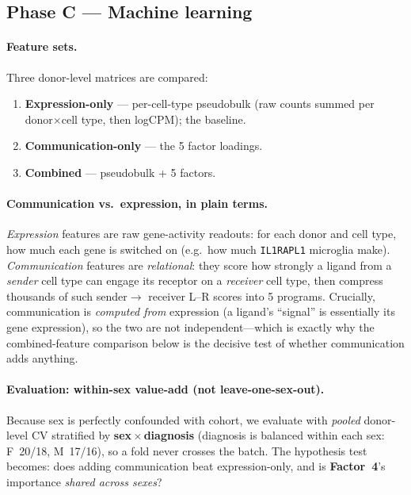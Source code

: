 \documentclass[11pt]{article}
\newcommand{\factorfour}{\textbf{Factor~4}}
\newcommand{\code}[1]{\texttt{\small #1}}
\begin{document}
\subsection{Phase C --- Machine learning}
\label{sec:phaseC}

\paragraph{Feature sets.} Three donor-level matrices are compared:
\begin{enumerate}
\item \textbf{Expression-only} --- per-cell-type pseudobulk (raw counts summed
per donor$\times$cell type, then logCPM); the baseline.
\item \textbf{Communication-only} --- the 5 factor loadings.
\item \textbf{Combined} --- pseudobulk + 5 factors.
\end{enumerate}

\paragraph{Communication vs.\ expression, in plain terms.}
\emph{Expression} features are raw gene-activity readouts: for each donor and
cell type, how much each gene is switched on (e.g.\ how much \code{IL1RAPL1}
microglia make). \emph{Communication} features are \emph{relational}: they score
how strongly a ligand from a \emph{sender} cell type can engage its receptor on
a \emph{receiver} cell type, then compress thousands of such sender$\rightarrow$
receiver L--R scores into 5 programs. Crucially, communication is \emph{computed
from} expression (a ligand's ``signal'' is essentially its gene expression), so
the two are not independent---which is exactly why the combined-feature
comparison below is the decisive test of whether communication adds anything.

\paragraph{Evaluation: within-sex value-add (not leave-one-sex-out).} Because
sex is perfectly confounded with cohort, we evaluate with \emph{pooled}
donor-level CV stratified by \textbf{sex\,$\times$\,diagnosis} (diagnosis is
balanced within each sex: F~20/18, M~17/16), so a fold never crosses the batch.
The hypothesis test becomes: does adding communication beat expression-only, and
is \factorfour's importance \emph{shared across sexes}?
\end{document}
